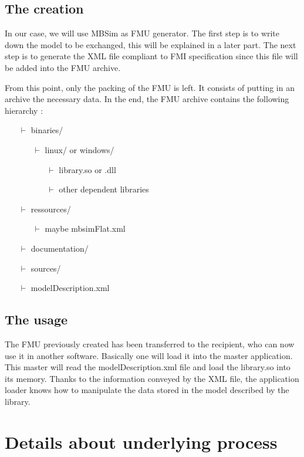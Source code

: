 \documentclass[10pt,a4paper]{report}
\begin{document}
\subsection*{The creation}
In our case, we will use MBSim as FMU generator. The first step is to write down the model to be exchanged, this will be explained in a later part. The next step is to generate the XML file compliant to FMI specification since this file will be added into the FMU archive.\par
%
From this point, only the packing of the FMU is left. It consists of putting in an archive the necessary data. In the end, the FMU archive contains the following hierarchy :
\begin{itemize}
\item[$\vdash$] binaries/
	\begin{itemize}
	\item[$\vdash$] linux/ or windows/
		\begin{itemize}
		\item[$\vdash$] library.so or .dll
		\item[$\vdash$] other dependent libraries
		\end{itemize}
	\end{itemize}
\item[$\vdash$] ressources/
	\begin{itemize}
	\item[$\vdash$] maybe mbsimFlat.xml
	\end{itemize}
\item[$\vdash$] documentation/
\item[$\vdash$] sources/
\item[$\vdash$] modelDescription.xml
\end{itemize}
%
\subsection*{The usage}
The FMU previously created has been transferred to the recipient, who can now use it in another software. Basically one will load it into the master application. This master will read the modelDescription.xml file and load the library.so into its memory. Thanks to the information conveyed by the XML file, the application loader knows how to manipulate the data stored in the model described by the library.
%
\section{Details about underlying process}
%
\end{document}
